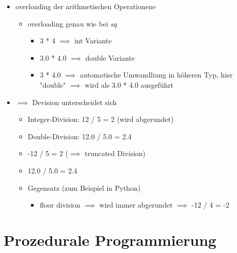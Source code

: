 \documentclass[a4paper]{scrartcl}
\begin{document}
\begin{itemize}
\begin{itemize}
\begin{itemize}
\begin{itemize}
\begin{verbatim}
#include <iostream>
#include <string>
int main() {
	std::cout << "Hello, world!" << std::endl;
	std::string out = "mein erstes Programm\n";
	std::cout << out;
	return 0;
}
\end{verbatim}
\end{itemize}
\end{itemize}
\item overloading der arithmetischen Operationene
\begin{itemize}
\item overloading genau wie bei $sq$
\begin{itemize}
\item 3 * 4 $\implies$ int Variante
\item 3.0 * 4.0 $\implies$ double Variante
\item 3 * 4.0 $\implies$ automatische Umwandliung in höheren Typ, hier "double" $\implies$ wird als 3.0 * 4.0 ausgeführt
\end{itemize}
\end{itemize}
\item $\implies$ Devision unterscheidet sich
\begin{itemize}
\item Integer-Division: 12 / 5 = 2 (wird abgerundet)
\item Double-Division: 12.0 / 5.0 = 2.4
\item -12 / 5 = 2 ($\implies$ truncated Division)
\item 12.0 / 5.0 = 2.4
\item Gegensatz (zum Beispiel in Python)
\begin{itemize}
\item floor division $\implies$ wird immer abgerundet $\implies$ -12 / 4 = -2
\end{itemize}
\end{itemize}
\end{itemize}
\end{itemize}
\section{Prozedurale Programmierung}
\label{sec-7}
\end{document}
